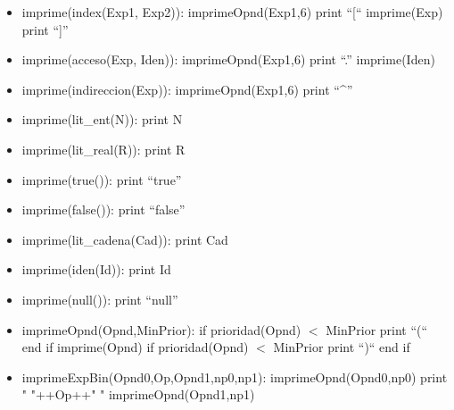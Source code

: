\documentclass[11pt]{article}
\begin{document}
\begin{itemize}
            \item imprime(index(Exp1, Exp2)):
                \subitem imprimeOpnd(Exp1,6)
                \subitem print “[“
                \subitem imprime(Exp)
                \subitem print “]”
            
            \item imprime(acceso(Exp, Iden)):
                \subitem imprimeOpnd(Exp1,6)
                \subitem print “.”
                \subitem imprime(Iden)
            
            \item imprime(indireccion(Exp)):
                \subitem imprimeOpnd(Exp1,6)
                \subitem print “\^{}”
            
            \item imprime(lit\_ent(N)):
                \subitem print N
            
            \item imprime(lit\_real(R)):
                \subitem print R
            
            \item imprime(true()):
                \subitem print “true”
            
            \item imprime(false()):
                \subitem print “false”
            
            \item imprime(lit\_cadena(Cad)):
                \subitem print Cad
            
            \item imprime(iden(Id)):
                \subitem print Id
            
            \item imprime(null()):
                \subitem print “null”
                \item imprimeOpnd(Opnd,MinPrior):
                \subitem if prioridad(Opnd) $<$ MinPrior
                    \subsubitem print “(“
                \subitem end if
                \subitem imprime(Opnd)
                \subitem if prioridad(Opnd) $<$ MinPrior
                    \subsubitem print “)“
                \subitem end if
            
            \item imprimeExpBin(Opnd0,Op,Opnd1,np0,np1):
                \subitem imprimeOpnd(Opnd0,np0) 
                \subitem print " "++Op++" " 
                \subitem imprimeOpnd(Opnd1,np1) 
            

\end{itemize}
\end{document}
